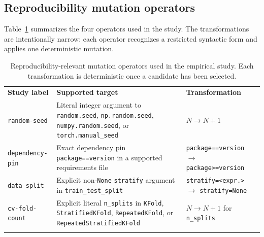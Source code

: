 \subsection{Reproducibility mutation operators}
\label{sec:mlrepromutate-operators}

Table~\ref{tab:mutation-operators} summarizes the four operators used in the
study. The transformations are intentionally narrow: each operator recognizes
a restricted syntactic form and applies one deterministic mutation.

\begin{table}[t]
\centering
\caption{Reproducibility-relevant mutation operators used in the empirical
study. Each transformation is deterministic once a candidate has been
selected.}
\label{tab:mutation-operators}

\vspace{0.45em}

\small
\renewcommand{\arraystretch}{1.30}
\setlength{\tabcolsep}{7pt}

\begin{tabularx}{\textwidth}{
    >{\raggedright\arraybackslash}p{}
    >{\raggedright\arraybackslash}X
    >{\raggedright\arraybackslash}p{}
}
\toprule
\addlinespace[2pt]

\textbf{Study label} &
\textbf{Supported target} &
\textbf{Transformation} \\

\addlinespace[2pt]
\midrule
\addlinespace[4pt]

\texttt{random-seed} &
Literal integer argument to
\texttt{random.seed},
\texttt{np.random.seed},
\texttt{numpy.random.seed}, or
\texttt{torch.manual\_seed} &
$N \rightarrow N+1$ \\

\addlinespace[5pt]

\texttt{dependency-pin} &
Exact dependency pin
\texttt{package==version}
in a supported requirements file &
\texttt{package==version}
$\rightarrow$
\texttt{package>=version} \\

\addlinespace[5pt]

\texttt{data-split} &
Explicit non-\texttt{None}
\texttt{stratify} argument in
\texttt{train\_test\_split} &
\texttt{stratify=<expr.>}
$\rightarrow$
\texttt{stratify=None} \\

\addlinespace[5pt]

\texttt{cv-fold-count} &
Explicit literal \texttt{n\_splits} in
\texttt{KFold}, \texttt{StratifiedKFold},
\texttt{RepeatedKFold}, or
\texttt{RepeatedStratifiedKFold} &
$N \rightarrow N+1$
for \texttt{n\_splits} \\

\addlinespace[4pt]
\bottomrule
\end{tabularx}

\vspace{0.3em}
\end{table}


